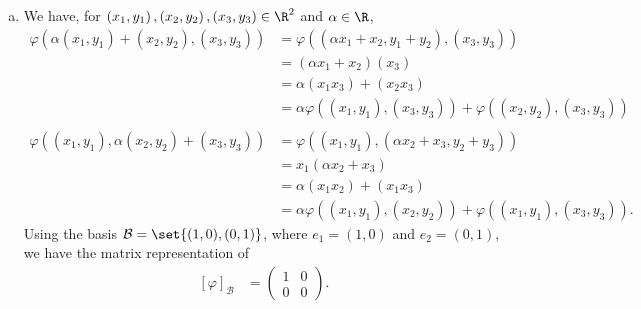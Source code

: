 \documentclass[10pt]{mypackage}
\begin{document}
\begin{solution}\hfill
  \begin{enumerate}[(a)]
    \item We have, for $\left(x_1,y_1\right),\left(x_2,y_2\right),\left(x_3,y_3\right)\in \R^2$ and $\alpha \in \R$,
      \begin{align*}
        \varphi\left(\alpha\left(x_1,y_1\right) + \left(x_2,y_2\right),\left(x_3,y_3\right)\right) &= \varphi\left(\left(\alpha x_1 + x_2,y_1 + y_2\right),\left(x_3,y_3\right)\right)\\
                                                                                                   &= \left(\alpha x_1 + x_2\right)\left(x_3\right)\\
                                                                                                   &= \alpha \left(x_1x_3\right) + \left(x_2x_3\right)\\
                                                                                                   &= \alpha \varphi\left(\left(x_1,y_1\right),\left(x_3,y_3\right)\right) + \varphi\left(\left(x_2,y_2\right),\left(x_3,y_3\right)\right)\\
                                                                                                   \\
        \varphi\left(\left(x_1,y_1\right),\alpha\left(x_2,y_2\right) + \left(x_3,y_3\right)\right) &= \varphi\left(\left(x_1,y_1\right),\left(\alpha x_2 + x_3,y_2 + y_3\right)\right)\\
                                                                                                   &= x_1\left(\alpha x_2 + x_3\right)\\
                                                                                                   &= \alpha \left(x_1 x_2\right) + \left(x_1x_3\right)\\
                                                                                                   &= \alpha \varphi\left(\left(x_1,y_1\right),\left(x_2,y_2\right)\right) + \varphi\left(\left(x_1,y_1\right),\left(x_3,y_3\right)\right).
      \end{align*}
      Using the basis $\mathcal{B}= \set{(1,0),(0,1)}$, where $e_1 = (1,0)$ and $e_2 = (0,1)$, we have the matrix representation of
      \begin{align*}
        \left[\varphi\right]_{\mathcal{B}} &= \begin{pmatrix}1 & 0 \\ 0 & 0\end{pmatrix}.

\end{align*}
\end{enumerate}
\end{solution}
\end{document}
